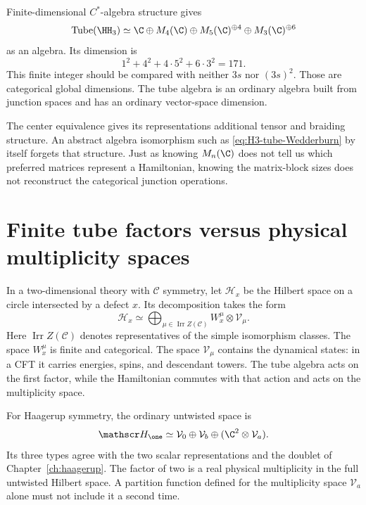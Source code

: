 \begin{example}
Finite-dimensional $C^*$-algebra structure gives
\begin{equation}
 \operatorname{Tube}(\HH_3)
 \simeq\C\oplus M_4(\C)\oplus M_5(\C)^{\oplus4}
 \oplus M_3(\C)^{\oplus6}
 \label{eq:H3-tube-Wedderburn}
\end{equation}
as an algebra.  Its dimension is
\[
 1^2+4^2+4\cdot5^2+6\cdot3^2=171.
\]
This finite integer should be compared with neither $3s$ nor
$(3s)^2$.  Those are categorical global dimensions.  The tube algebra
is an ordinary algebra built from junction spaces and has an ordinary
vector-space dimension.
\end{example}

The center equivalence gives its representations additional tensor
and braiding structure.  An abstract algebra isomorphism such as
\eqref{eq:H3-tube-Wedderburn} by itself forgets that structure.
Just as knowing $M_n(\C)$ does not tell us which preferred matrices
represent a Hamiltonian, knowing the matrix-block sizes does not
reconstruct the categorical junction operations.

\section{Finite tube factors versus physical multiplicity spaces}

In a two-dimensional theory with $\mathcal C$ symmetry, let
$\mathscr H_x$ be the Hilbert space on a circle intersected by a
defect $x$.  Its decomposition takes the form
\begin{equation}
 \mathscr H_x\simeq\bigoplus_{\mu\in\operatorname{Irr}Z(\mathcal C)}
 W_x^\mu\otimes\mathcal V_\mu.
 \label{eq:physical-tube-decomposition}
\end{equation}
Here $\operatorname{Irr}Z(\mathcal C)$ denotes representatives of the
simple isomorphism classes. The space $W_x^\mu$ is finite and
categorical. The space
$\mathcal V_\mu$ contains the dynamical states: in a CFT it carries
energies, spins, and descendant towers.  The tube algebra acts on
the first factor, while the Hamiltonian commutes with that action
and acts on the multiplicity space.

For Haagerup symmetry, the ordinary untwisted space is
\begin{equation}
 \mathscr H_{\one}\simeq
 \mathcal V_0\oplus\mathcal V_b\oplus
 (\C^2\otimes\mathcal V_a).
 \label{eq:H3-untwisted-decomposition}
\end{equation}
Its three types agree with the two scalar representations and the
doublet of Chapter~\ref{ch:haagerup}.  The factor of two is a real
physical multiplicity in the full untwisted Hilbert space.  A
partition function defined for the multiplicity space
$\mathcal V_a$ alone must not include it a second time.

